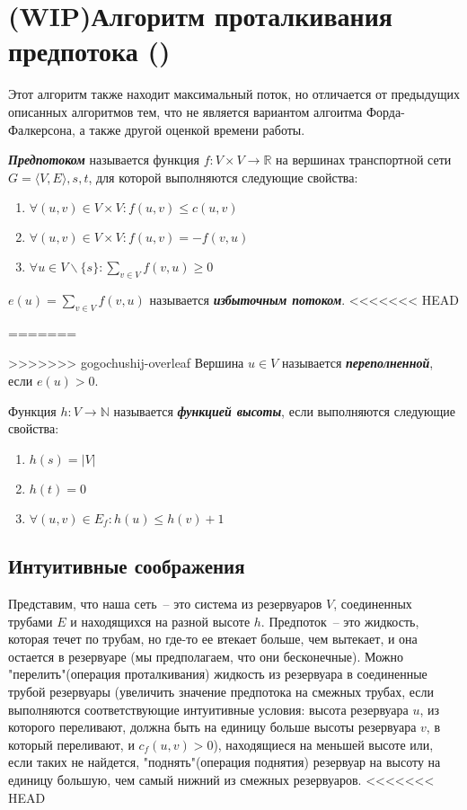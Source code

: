 \let\bf\bfseries
\let\it\itshape
\section{(WIP)Алгоритм проталкивания предпотока (\groth)}
Этот алгоритм также находит максимальный поток, но отличается от предыдущих описанных алгоритмов тем, что не является вариантом алгоитма Форда-Фалкерсона, а также другой оценкой времени работы.
\begin{definition}
	{\bf\it Предпотоком} называется функция $f\colon V\times V\to\mathbb{R}$ на вершинах транспортной сети $G=\langle V,E\rangle,s,t$, для которой выполняются следующие свойства:
	\begin{enumerate}
		\item $\forall(u,v)\in V\times V\colon f(u,v)\le c(u,v)$
		\item $\forall(u,v)\in V\times V\colon f(u,v)=-f(v,u)$
		\item $\forall u\in V\smallsetminus\{s\}\colon \sum_{v\in V} f(v,u)\ge0$
	\end{enumerate}
	$e(u)=\sum_{v\in V} f(v,u)$ называется {\bf\it избыточным потоком}.
<<<<<<< HEAD
	
=======

>>>>>>> gogochushij-overleaf
	Вершина $u\in V$ называется {\bf\it переполненной}, если $e(u)>0$.
\end{definition}
\begin{definition}
	Функция $h\colon V\to\mathbb{N}$ называется {\bf\it функцией высоты}, если выполняются следующие свойства:
	\begin{enumerate}
		\item $h(s)=|V|$
		\item $h(t)=0$
		\item $\forall (u,v)\in E_f\colon h(u)\le h(v)+1$
	\end{enumerate}
\end{definition}
\subsection{Интуитивные соображения}
Представим, что наша сеть~-- это система из резервуаров $V$, соединенных трубами $E$ и находящихся на разной высоте $h$. Предпоток~-- это жидкость, которая течет по трубам, но где-то ее втекает больше, чем вытекает, и она остается в резервуаре (мы предполагаем, что они бесконечные). Можно "перелить"(операция проталкивания) жидкость из резервуара в соединенные трубой резервуары (увеличить значение предпотока на смежных трубах, если выполняются соответствующие интуитивные условия: высота резервуара $u$, из которого переливают, должна быть на единицу больше высоты резервуара $v$, в который переливают, и $c_f(u,v)>0$), находящиеся на меньшей высоте или, если таких не найдется, "поднять"(операция поднятия) резервуар на высоту на единицу большую, чем самый нижний из смежных резервуаров.
<<<<<<< HEAD
	
